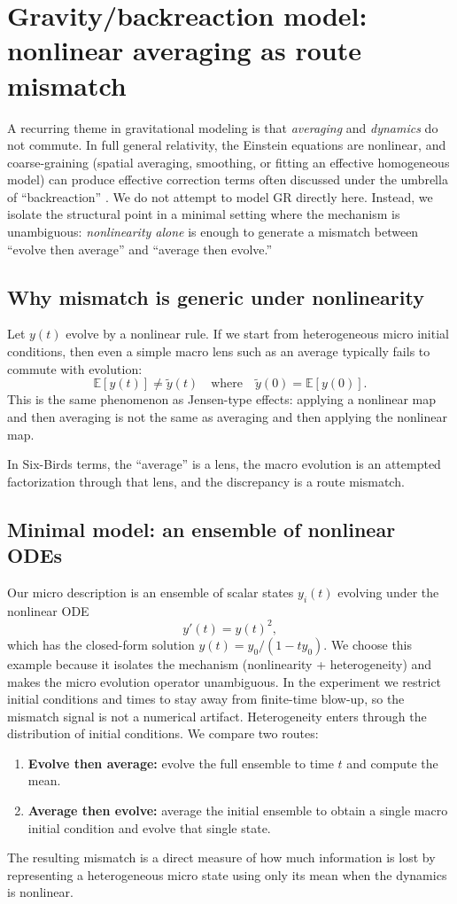 \documentclass[11pt]{article}
\begin{document}
 \section{Gravity/backreaction model: nonlinear averaging as route mismatch}
\label{sec:gravity}

A recurring theme in gravitational modeling is that \emph{averaging} and \emph{dynamics} do not commute. In full general relativity, the Einstein equations are nonlinear, and coarse-graining (spatial averaging, smoothing, or fitting an effective homogeneous model) can produce effective correction terms often discussed under the umbrella of ``backreaction'' \citep{buchert2000,buchert2001,clarkson2011,greenwald2011}. We do not attempt to model GR directly here. Instead, we isolate the structural point in a minimal setting where the mechanism is unambiguous: \emph{nonlinearity alone} is enough to generate a mismatch between ``evolve then average'' and ``average then evolve.''

\subsection{Why mismatch is generic under nonlinearity}
Let $y(t)$ evolve by a nonlinear rule. If we start from heterogeneous micro initial conditions, then even a simple macro lens such as an average typically fails to commute with evolution:
\[
  \mathbb{E}[y(t)] \neq \tilde{y}(t)\quad\text{where}\quad \tilde{y}(0)=\mathbb{E}[y(0)].
\]
This is the same phenomenon as Jensen-type effects: applying a nonlinear map and then averaging is not the same as averaging and then applying the nonlinear map.

In Six-Birds terms, the ``average'' is a lens, the macro evolution is an attempted factorization through that lens, and the discrepancy is a route mismatch.

\subsection{Minimal model: an ensemble of nonlinear ODEs}
Our micro description is an ensemble of scalar states $y_i(t)$ evolving under the nonlinear ODE
\[
  y'(t)=y(t)^2,
\]
which has the closed-form solution $y(t)=y_0/(1-ty_0)$.
We choose this example because it isolates the mechanism (nonlinearity + heterogeneity) and makes the micro evolution operator unambiguous.
In the experiment we restrict initial conditions and times to stay away from finite-time blow-up, so the mismatch signal is not a numerical artifact.
Heterogeneity enters through the distribution of initial conditions. We compare two routes:
\begin{enumerate}
  \item \textbf{Evolve then average:} evolve the full ensemble to time $t$ and compute the mean.
  \item \textbf{Average then evolve:} average the initial ensemble to obtain a single macro initial condition and evolve that single state.
\end{enumerate}
The resulting mismatch is a direct measure of how much information is lost by representing a heterogeneous micro state using only its mean when the dynamics is nonlinear.
\end{document}
